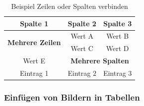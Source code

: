 \begin{table}[H]
    \centering
    \renewcommand{\arraystretch}{1.5}
    \begin{tabular}{|c|c|c|}
        \hline
        \textbf{Spalte 1}                        & \textbf{Spalte 2}                             & \textbf{Spalte 3} \\
        \hline
        \multirow{2}{*}{\textbf{Mehrere Zeilen}} & Wert A                                        & Wert B            \\
                                                 & Wert C                                        & Wert D            \\
        \hline
        Wert E                                   & \multicolumn{2}{c|}{\textbf{Mehrere Spalten}}                     \\
        \hline
        Eintrag 1                                & Eintrag 2                                     & Eintrag 3         \\
        \hline
    \end{tabular}
    \caption{Beispiel Zeilen oder Spalten verbinden}
    \label{tab:example_multirow_multicolumn}
\end{table}


\subsubsection{Einfügen von Bildern in Tabellen}
